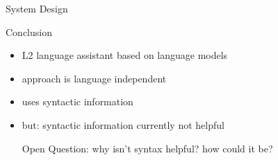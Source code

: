 \documentclass[final,t]{beamer}
\begin{document}
\begin{frame}{}
\begin{columns}[t]
\begin{column}{.47\linewidth}
\begin{block}{System Design}
\end{block}

\vspace{3ex}

\begin{block}{Conclusion}

\begin{itemize}
\item L2 language assistant based on language models
\item approach is language independent
\item uses syntactic information
\item but: syntactic information currently not helpful 

  Open Question: why isn't syntax helpful?  how could it be?
\end{itemize}

\end{block}


\end{column}
\end{columns}


\end{frame}
\end{document}
